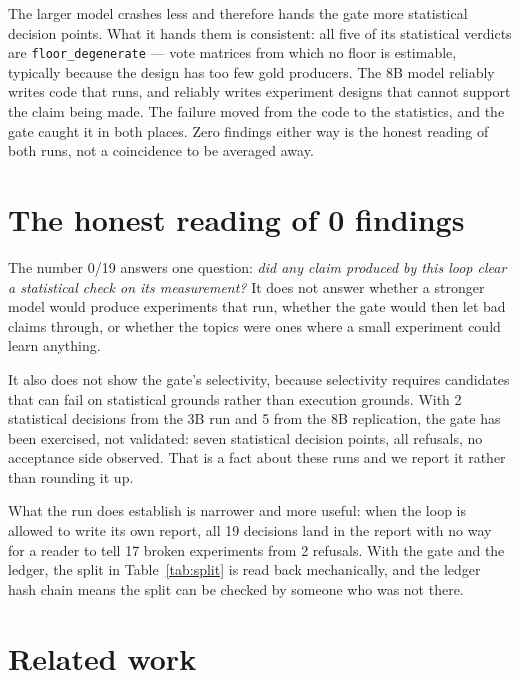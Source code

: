 \documentclass[11pt]{article}
\newcommand{\code}[1]{{\small\texttt{#1}}}
\begin{document}
The larger model crashes less and therefore hands the gate more statistical
decision points. What it hands them is consistent: all five of its statistical
verdicts are \code{floor\_degenerate} --- vote matrices from which no floor is
estimable, typically because the design has too few gold producers. The 8B
model reliably writes code that runs, and reliably writes experiment designs
that cannot support the claim being made. The failure moved from the code to
the statistics, and the gate caught it in both places. Zero findings either
way is the honest reading of both runs, not a coincidence to be averaged away.

\section{The honest reading of 0 findings}

The number 0/19 answers one question: \emph{did any claim produced by this
loop clear a statistical check on its measurement?} It does not answer whether
a stronger model would produce experiments that run, whether the gate would
then let bad claims through, or whether the topics were ones where a small
experiment could learn anything.

It also does not show the gate's selectivity, because selectivity requires
candidates that can fail on statistical grounds rather than execution grounds.
With 2 statistical decisions from the 3B run and 5 from the 8B replication,
the gate has been exercised, not validated: seven statistical decision points,
all refusals, no acceptance side observed. That is a fact about these runs and
we report it rather than rounding it up.

What the run does establish is narrower and more useful: when the loop is
allowed to write its own report, all 19 decisions land in the report with no
way for a reader to tell 17 broken experiments from 2 refusals. With the gate
and the ledger, the split in Table~\ref{tab:split} is read back mechanically,
and the ledger hash chain means the split can be checked by someone who was
not there.

\section{Related work}
\end{document}
